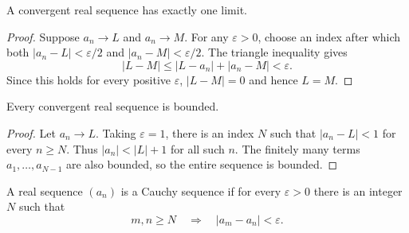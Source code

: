 \begin{theorem}
A convergent real sequence has exactly one limit.
\end{theorem}

\begin{proof}
Suppose $a_n\to L$ and $a_n\to M$. For any $\varepsilon>0$, choose an index after which both $|a_n-L|<\varepsilon/2$ and $|a_n-M|<\varepsilon/2$. The triangle inequality gives
\[
 |L-M|\leq |L-a_n|+|a_n-M|<\varepsilon.
\]
Since this holds for every positive $\varepsilon$, $|L-M|=0$ and hence $L=M$.
\end{proof}

\begin{theorem}
Every convergent real sequence is bounded.
\end{theorem}

\begin{proof}
Let $a_n\to L$. Taking $\varepsilon=1$, there is an index $N$ such that $|a_n-L|<1$ for every $n\geq N$. Thus $|a_n|<|L|+1$ for all such $n$. The finitely many terms $a_1,\ldots,a_{N-1}$ are also bounded, so the entire sequence is bounded.
\end{proof}

\clearpage

\begin{definition}
A real sequence $(a_n)$ is a Cauchy sequence if for every $\varepsilon>0$ there is an integer $N$ such that
\[
 m,n\geq N\quad\Longrightarrow\quad |a_m-a_n|<\varepsilon.
\]
\end{definition}

